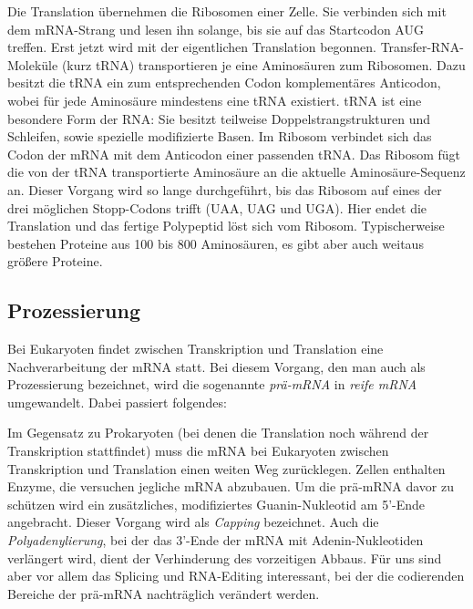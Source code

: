 Die Translation übernehmen die Ribosomen einer Zelle. Sie verbinden sich mit dem mRNA-Strang und lesen ihn solange, bis sie auf das Startcodon AUG treffen. Erst jetzt wird mit der eigentlichen Translation begonnen. Transfer-RNA-Moleküle (kurz tRNA) transportieren je eine Aminosäuren zum Ribosomen. Dazu besitzt die tRNA ein zum entsprechenden Codon komplementäres Anticodon, wobei für jede Aminosäure mindestens eine tRNA existiert. tRNA ist eine besondere Form der RNA: Sie besitzt teilweise Doppelstrangstrukturen und Schleifen, sowie spezielle modifizierte Basen. Im Ribosom verbindet sich das Codon der mRNA mit dem Anticodon einer passenden tRNA. Das Ribosom fügt die von der tRNA transportierte Aminosäure an die aktuelle Aminosäure-Sequenz an. Dieser Vorgang wird so lange durchgeführt, bis das Ribosom auf eines der drei möglichen Stopp-Codons trifft (UAA, UAG und UGA). Hier endet die Translation und das fertige Polypeptid löst sich vom Ribosom. Typischerweise bestehen Proteine aus 100 bis 800 Aminosäuren, es gibt aber auch weitaus größere Proteine.  

\subsection{Prozessierung}
\label{sec:bio:pbsyn:prozess}

Bei Eukaryoten findet zwischen Transkription und Translation eine Nachverarbeitung der mRNA statt. Bei diesem Vorgang, den man auch als Prozessierung bezeichnet, wird die sogenannte \emph{prä-mRNA} in \emph{reife mRNA} umgewandelt. Dabei passiert folgendes:


Im Gegensatz zu Prokaryoten (bei denen die Translation noch während der Transkription stattfindet) muss die mRNA bei Eukaryoten zwischen Transkription und Translation einen weiten Weg zurücklegen. Zellen enthalten Enzyme, die versuchen jegliche mRNA abzubauen. Um die prä-mRNA davor zu schützen wird ein zusätzliches, modifiziertes Guanin-Nukleotid am 5'-Ende angebracht. Dieser Vorgang wird als \emph{Capping} bezeichnet. Auch die \emph{Polyadenylierung}, bei der das 3'-Ende der mRNA mit Adenin-Nukleotiden verlängert wird, dient der Verhinderung des vorzeitigen Abbaus. Für uns sind aber vor allem das Splicing und RNA-Editing interessant, bei der die codierenden Bereiche der prä-mRNA nachträglich verändert werden.

